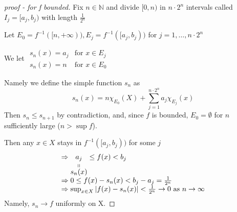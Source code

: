 \begin{proof}[proof - for f bounded]
    Fix \(n \in \mathbb{N}\) and divide \([0,n)\) in \(n \cdot 2^n\) intervals called \(I_j = [a_j,b_j)\) with length \(\frac{1}{2^n}\)

    Let \(E_0 = f^{-1}([n, +\infty)), E_j = f^{-1}([a_j, b_j))\) for \(j = 1, \ldots, n\cdot 2^n\)
    
    We let \(\begin{array}{cc}
        s_n(x) = a_j & \mbox{for } x \in E_j \\
        s_n(x) = n & \mbox{for } x \in E_0
    \end{array}\)

    Namely we define the simple function \(s_n\) as
    \[
    s_n (x) = n\chi_{E_0}(X) + \sum_{j =1}^{n \cdot 2^n} a_j \chi_{E_j}(x)    
    \]
    Then \(s_n \leq s_{n+1}\) by contradiction, and, since \(f\) is bounded, \(E_0 = \emptyset\) for \(n\) sufficiently large (\(n > \sup f\)).

    Then any \(x \in X\) stays in \(f^{-1}([a_j, b_j))\) for some \(j\) 
    \[
        \begin{array}{l}
            \Rightarrow \stackbelow{a_j}{s_n(x)} \leq f(x) < b_j \\
            \Rightarrow 0 \leq f(x)-s_n(x) < b_j - a_j = \frac{1}{2^n} \\
            \Rightarrow \sup_{x \in X} \abs{f(x)- s_n({x})} < \frac{1}{2^n} \to 0 \mbox{ as } n \to \infty
        \end{array}
    \]
    Namely, \(s_n \to f\) uniformly on X.
\end{proof}
